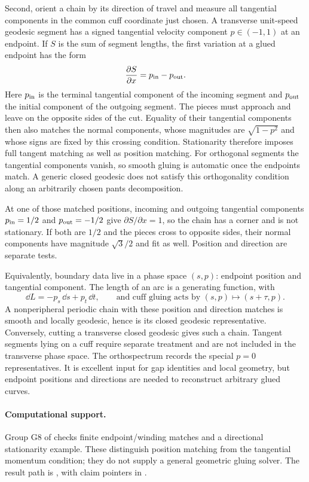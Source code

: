 Second, orient a chain by its direction of travel and measure all
tangential components in the common cuff coordinate just chosen.
A transverse unit-speed geodesic segment has a signed tangential velocity
component $p\in(-1,1)$ at an endpoint. If $S$ is the sum of segment lengths, the first
variation at a glued endpoint has the form
\begin{equation}
 \frac{\partial S}{\partial x}=p_{\rm in}-p_{\rm out}.
 \label{eq:momentummatch}
\end{equation}
Here $p_{\rm in}$ is the terminal tangential component of the incoming
segment and $p_{\rm out}$ the initial component of the outgoing segment.
The pieces must approach and leave on the opposite sides of the cut.
Equality of their tangential components then also matches the normal
components, whose magnitudes are $\sqrt{1-p^2}$ and whose signs are fixed
by this crossing condition. Stationarity therefore imposes full tangent
matching as well as position matching. For
orthogonal segments the tangential components vanish, so smooth gluing
is automatic once the endpoints match. A generic closed geodesic does
not satisfy this orthogonality condition along an arbitrarily chosen
pants decomposition.

At one of those matched positions, incoming and outgoing tangential
components $p_{\rm in}=1/2$ and $p_{\rm out}=-1/2$ give
$\partial S/\partial x=1$, so the chain has a corner and is
not stationary. If both are $1/2$ and the pieces cross to opposite
sides, their normal components have magnitude $\sqrt3/2$ and
fit as well. Position and direction are separate tests.

Equivalently, boundary data live in a phase space $(s,p)$: endpoint
position and tangential component. The length of an arc is a generating
function, with
\[
 \dd L=-p_s\,\dd s+p_t\,\dd t,
 \qquad\text{and cuff gluing acts by }(s,p)\longmapsto(s+\tau,p).
\]
A nonperipheral periodic chain with these position and direction matches
is smooth and locally geodesic, hence is its closed geodesic
representative. Conversely, cutting a transverse closed geodesic gives
such a chain. Tangent segments lying on a cuff require separate treatment
and are not included in the transverse phase space.
The orthospectrum records the special $p=0$ representatives. It is
excellent input for gap identities and local geometry, but endpoint
positions and directions are needed to reconstruct arbitrary glued curves.

\paragraph{Computational support.}
Group G8 of 
checks finite endpoint/winding matches and a directional stationarity
example. These distinguish position matching from the tangential
momentum condition; they do not supply a general geometric gluing
solver. The result path is ,
with claim pointers in .
